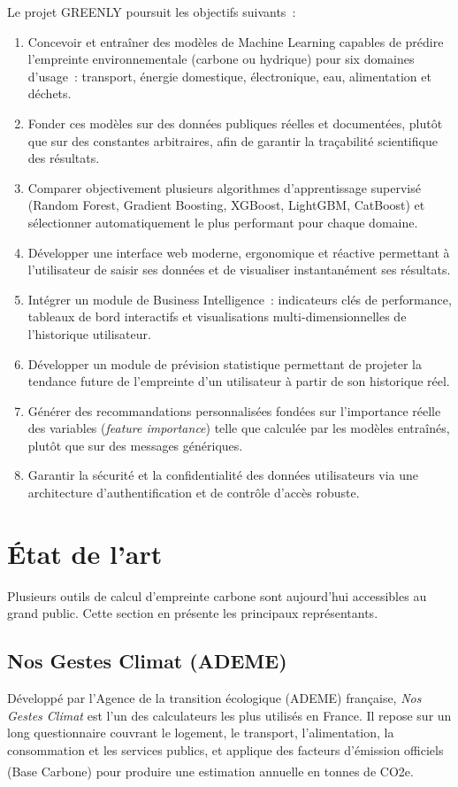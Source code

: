 Le projet GREENLY poursuit les objectifs suivants~:

\begin{enumerate}
    \item Concevoir et entraîner des modèles de Machine Learning capables de prédire l'empreinte environnementale (carbone ou hydrique) pour six domaines d'usage~: transport, énergie domestique, électronique, eau, alimentation et déchets.
    \item Fonder ces modèles sur des données publiques réelles et documentées, plutôt que sur des constantes arbitraires, afin de garantir la traçabilité scientifique des résultats.
    \item Comparer objectivement plusieurs algorithmes d'apprentissage supervisé (Random Forest, Gradient Boosting, XGBoost, LightGBM, CatBoost) et sélectionner automatiquement le plus performant pour chaque domaine.
    \item Développer une interface web moderne, ergonomique et réactive permettant à l'utilisateur de saisir ses données et de visualiser instantanément ses résultats.
    \item Intégrer un module de Business Intelligence~: indicateurs clés de performance, tableaux de bord interactifs et visualisations multi-dimensionnelles de l'historique utilisateur.
    \item Développer un module de prévision statistique permettant de projeter la tendance future de l'empreinte d'un utilisateur à partir de son historique réel.
    \item Générer des recommandations personnalisées fondées sur l'importance réelle des variables (\textit{feature importance}) telle que calculée par les modèles entraînés, plutôt que sur des messages génériques.
    \item Garantir la sécurité et la confidentialité des données utilisateurs via une architecture d'authentification et de contrôle d'accès robuste.
\end{enumerate}

\section{État de l'art}
\label{sec:etat-art}

Plusieurs outils de calcul d'empreinte carbone sont aujourd'hui accessibles au grand public. Cette section en présente les principaux représentants.

\subsection{Nos Gestes Climat (ADEME)}
Développé par l'Agence de la transition écologique (ADEME) française, \textit{Nos Gestes Climat} \cite{nosGestesClimat} est l'un des calculateurs les plus utilisés en France. Il repose sur un long questionnaire couvrant le logement, le transport, l'alimentation, la consommation et les services publics, et applique des facteurs d'émission officiels (Base Carbone\textsuperscript{\textregistered}) pour produire une estimation annuelle en tonnes de CO2e.

